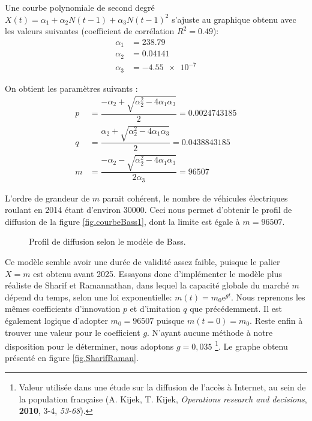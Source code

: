 		Une courbe polynomiale de second degré $X(t) = \alpha_1 + \alpha_2 N(t-1) + \alpha_3 N(t-1)^2$ s'ajuste au graphique obtenu avec les valeurs suivantes (coefficient de corrélation $R^2 = \num{0.49}$):
		\begin{align*}
			\alpha_1 &= \num{238.79}\\
			\alpha_2 &= \num{0.04141}\\
			\alpha_3 &= \num{-4.55e-7}
		\end{align*}

		On obtient les paramètres suivants :
		\begin{align*}
			p &= \dfrac{-\alpha_2 + \sqrt{\alpha_2^2 - 4 \alpha_1 \alpha_3}}{2} = \num{0.0024743185}\\
			q &= \dfrac{\alpha_2 + \sqrt{\alpha_2^2 - 4 \alpha_1 \alpha_3}}{2} = \num{0.0438843185}\\
			m &= \dfrac{-\alpha_2 - \sqrt{\alpha_2^2 - 4 \alpha_1 \alpha_3}}{2 \alpha_3} = \num{96507}
		\end{align*}

		L'ordre de grandeur de $m$ parait cohérent, le nombre de véhicules électriques roulant en 2014 étant d'environ \num{30000}. Ceci nous permet d'obtenir le profil de diffusion de la figure \vref{fig.courbeBass1}, dont la limite est égale à $m = \num{96507}$.

		\begin{figure}[!h]
			\centering
			\caption{Profil de diffusion selon le modèle de Bass.\label{fig.courbeBass1}}
		\end{figure}

		Ce modèle semble avoir une durée de validité assez faible, puisque le palier $X = m$ est obtenu avant 2025. Essayons donc d'implémenter le modèle plus réaliste de Sharif et Ramannathan, dans lequel la capacité globale du marché $m$ dépend du temps, selon une loi exponentielle: $m(t) = m_0 \mathrm{e}^{gt}$.
		Nous reprenons les mêmes coefficients d'innovation $p$ et d'imitation $q$ que précédemment. Il est également logique d'adopter $m_0 = \num{96507}$ puisque $m(t = 0) = m_0$.
		Reste enfin à trouver une valeur pour le coefficient $g$. N'ayant aucune méthode à notre disposition pour le déterminer, nous adoptons $g = 0,035$ \footnote{Valeur utilisée dans une étude sur la diffusion de l'accès à Internet, au sein de la population française (A. Kijek, T. Kijek, \textit{Operations research and decisions}, \textbf{2010}, 3-4, \textit{53-68}).}.
		Le graphe obtenu présenté en figure \vref{fig.SharifRaman}.
		
